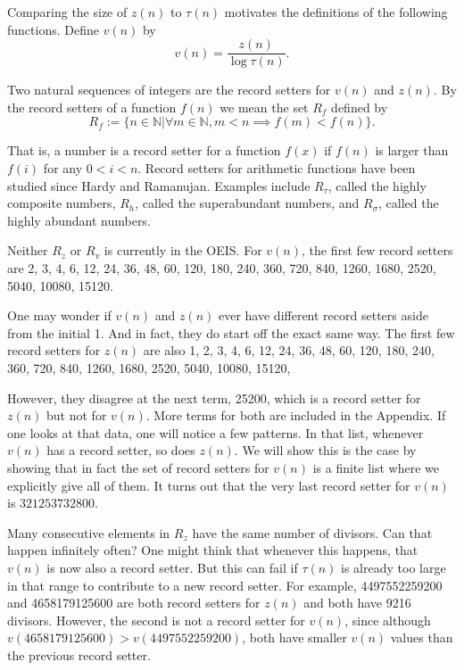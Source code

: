\documentclass{article}
\begin{document}
Comparing the size of $z(n)$ to $\tau(n)$ motivates the definitions of the following functions. %
Define $v(n)$ by $$v(n) = \frac{z(n)}{\log \tau(n)}.$$

Two natural sequences of integers are the record setters for $v(n)$ and $z(n)$. By the record setters of a function $f(n)$ we mean the set $R_f$ defined by 
$$R_f:=\{n \in \mathbb{N}| \forall m \in \mathbb{N}, m < n \implies f(m) < f(n)\}.$$

That is, a number is a record setter for a function $f(x)$ if $f(n)$ is larger than $f(i)$ for any $0 < i<n$.
Record setters for arithmetic functions have been studied since Hardy and Ramanujan. Examples include $R_\tau$, called the highly composite numbers, $R_{h}$, called the superabundant numbers, and $R_\sigma$, called the highly abundant numbers.\cite{Alaoglu and Erdos}\cite{Ramanujan HC}

Neither $R_z$ or $R_v$ is currently in the OEIS.
For $v(n)$, the first few record setters are
2, 3, 4, 6, 12, 24, 36, 48, 60, 120, 180, 240, 360, 720, 840, 1260, 1680, 2520, 5040, 10080, 15120.

One may wonder if $v(n)$ and $z(n)$ ever have different record setters aside from the initial 1. And in fact, they do start off the exact same way. The first few record setters for $z(n)$ are also 
1, 2, 3, 4, 6, 12, 24, 36, 48, 60, 120, 180, 240, 360, 720, 840,	1260,	 1680, 2520, 5040, 10080, 15120,

However, they disagree at the next term, 25200, which is a record setter for $z(n)$ but not for $v(n).$ More terms for both are included in the Appendix. If one looks at that data, one will notice a few patterns. In that list, whenever $v(n)$ has a record setter, so does $z(n)$. We will show this is the case by showing that in fact the set of record setters for $v(n)$ is a finite list where we explicitly give all of them.  It  turns out that the very last record setter for $v(n)$ is $321253732800$. 

Many consecutive elements in  $R_z$ have the same number of divisors. Can that happen infinitely often? One might think that whenever this happens, that $v(n)$ is now also a record setter. But this can fail if $\tau(n)$ is already too large in that range to contribute to a new record setter. For example, 4497552259200 and 4658179125600 are both record setters for $z(n)$ and both have 9216 divisors. However, the second is not a record setter for $v(n)$, since although $v(4658179125600) > v(4497552259200)$, both have smaller $v(n)$ values than the previous record setter.
\end{document}
